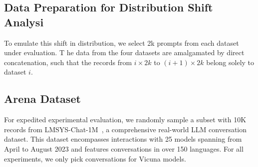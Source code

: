 \subsection{Data Preparation for Distribution Shift Analysi}
To emulate this shift in distribution, 
\label{appendix:distribution-shift}
we select 2k prompts from each dataset under evaluation. T
he data from the four datasets are amalgamated by direct concatenation, 
such that the records from $i\times2k$ to $(i+1)\times2k$ belong solely to dataset 
$i$. 

\subsection{Arena Dataset}
\label{appendix:arena}
For expedited experimental evaluation, we randomly sample a subset with 10K records
from LMSYS-Chat-1M~\cite{zheng2023lmsyschat1m}, 
a comprehensive real-world LLM conversation dataset. This dataset encompasses interactions with 25 models spanning 
from April to August 2023 and features conversations in over 150 languages. For all experiments, we only pick conversations for Vicuna models.

